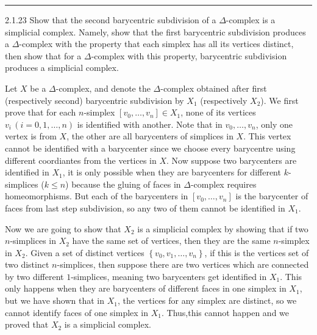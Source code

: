\documentclass[a4paper, 12pt]{article}
\begin{document}
\noindent\rule{7in}{2.8pt}

\begin{problem}{2.1.23}
Show that the second barycentric subdivision of a \(\Delta\)-complex is a simplicial complex. Namely, show that the first barycentric subdivision produces a \(\Delta\)-complex 
with the property that each simplex has all its vertices distinct, then show that for a \(\Delta\)-complex with this property, barycentric subdivision produces a simplicial complex.
\end{problem}
\begin{solution}
Let \(X\) be a \(\Delta\)-complex, and denote the \(\Delta\)-complex obtained after first (respectively second)	barycentric subdivision by \(X_1\) (respectively \(X_2\)). 
We first prove that for each \(n\)-simplex \([v_0,\ldots,v_n]\in X_1\), none of its vertices \(v_i\,(i=0,1,\ldots,n)\) is identified with another. Note that in \(v_0,\ldots,v_n\), only one vertex is from \(X\), the other are all barycenters of 
simplices in \(X\). This vertex cannot be identified with a barycenter since we choose every barycentre using different coordiantes from the vertices in \(X\). Now suppose two barycenters are identified in \(X_1\), it is only possible when they are barycenters 
for different \(k\)-simplices (\(k\leq n\)) because the gluing of faces in \(\Delta\)-complex requires homeomorphisms. But each of the barycenters in \([v_0,\ldots,v_n]\) is the barycenter of faces from last step subdivision, so any two of them cannot be identified in \(X_1\). 
\par 
Now we are going to show that \(X_2\) is a simplicial complex by showing that if two \(n\)-simplices in \(X_2\) have the same set of vertices, then they are the same \(n\)-simplex in \(X_2\). Given a set of distinct vertices \(\left\{ v_0,v_1,\ldots,v_n \right\}\), 
if this is the vertices set of two distinct \(n\)-simplices, then suppose there are two vertices which are connected by two different \(1\)-simplices, meaning two barycenters get identified in \(X_1\). This only happens when they are barycenters of different faces in one simplex in \(X_1\), but 
we have shown that in \(X_1\), the vertices for any simplex are distinct, so we cannot identify faces of one simplex in \(X_1\). Thus,this cannot happen and we proved that \(X_2\) is a simplicial complex.
\end{solution}
\end{document}
